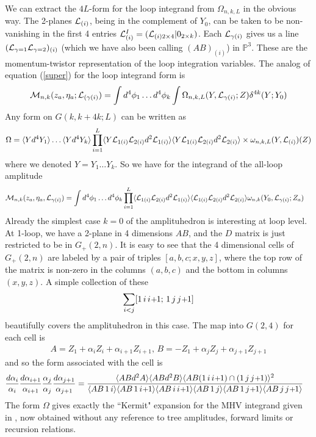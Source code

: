 \documentclass[12pt,nohyper,twosided]{JHEP3}
\newcommand{\be}{\begin{eqnarray}}
\newcommand{\ee}{\end{eqnarray}}
\newcommand{\smallplus}{\hspace{0.5pt}\text{{\small+}}\hspace{-0.5pt}}
\newcommand{\pl}{\smallplus}
\begin{document}
We can extract the $4L$-form for the loop integrand from
$\Omega_{n,k,L}$ in the obvious way. The 2-planes ${\cal L}_{(i)}$,
being in the complement of $Y_0$, can be taken to be non-vanishing
in the first 4 entries ${\cal L}^I_{ (i)}  = ({\cal L}_{(i) 2 \times
4} | 0_{2 \times k})$. Each ${\cal L}_{\gamma (i)}$ gives us a line
$({\cal L}_{\gamma =1} {\cal L}_{\gamma = 2})_{(i)}$ (which we have
also been calling $(AB)_{(i)}$) in $\mathbb{P}^3$. These are the
momentum-twistor representation of the loop integration variables.
The analog of equation (\ref{super}) for the loop integrand form is
\be {\cal M}_{n,k}(z_a,\eta_a; {\cal L}_{(\gamma (i)}) = \int d^{4}
\phi_1 \dots d^4 \phi_k \int \Omega_{n,k,L}(Y,{\cal L}_{\gamma
(i)};Z) \delta^{4k}(Y;Y_0) \ee Any form on $G(k,k+4k;L)$ can be
written as
\begin{equation}
\Omega =  \langle Yd^4 Y_1 \rangle \dots \langle Yd^4 Y_k \rangle
\prod_{i=1}^L \langle Y {\cal L}_{1(i)} {\cal L}_{2(i)} d^2 {\cal
L}_{1(i)} \rangle \langle Y {\cal L}_{1(i)} {\cal L}_{2(i)} d^2
{\cal L}_{2(i)} \rangle \times \omega_{n,k,L}(Y,{\cal L}_{(i)})(Z)
\end{equation}
where we denoted $Y=Y_1\dots Y_k$. So we have for the integrand of
the all-loop amplitude
\begin{align}
{\cal M}_{n,k}(z_a,\eta_a,{\cal L}_{\gamma(i)}) &= \int d^4 \phi_1
\dots d^4 \phi_k  \prod_{i=1}^L \langle {\cal L}_{1(i)} {\cal
L}_{2(i)} d^2 {\cal L}_{1(i)} \rangle \langle  {\cal L}_{1(i)} {\cal
L}_{2(i)} d^2 {\cal L}_{2(i)} \rangle \omega_{n,k}(Y_0,{\cal
L}_{\gamma(i)};Z_a)
\end{align}
Already the simplest case $k=0$ of the amplituhedron is interesting
at loop level. At 1-loop, we have a 2-plane in 4 dimensions $AB$,
and  the $D$ matrix is just restricted to be in $G_+(2,n)$. It is
easy to see that the 4 dimensional cells of $G_+(2,n)$ are labeled
by a pair of triples $[a,b,c;x,y,z]$, where the top row of the
matrix is non-zero in the columns $(a,b,c)$ and the bottom in
columns $(x,y,z)$. A simple collection of these \be \sum _{i<j}
[1\,i\,i\pl1;\,1\,j\,j\pl1] \ee beautifully covers the amplituhedron
in this case. The map into $G(2,4)$ for each cell is \be A = Z_1 +
\alpha_i Z_i + \alpha_{i+1} Z_{i+1}, \, B  = -Z_1 + \alpha_j Z_j +
\alpha_{j+1} Z_{j+1} \ee and so the form associated with the cell is
\begin{align} &\frac{d
\alpha_i}{\alpha_i} \frac{d\alpha_{i+1}}{\alpha_{i+1}}
\frac{\alpha_j}{\alpha_j} \frac{d \alpha_{j+1}}{\alpha_{j+1}} =
\frac{\langle AB d^2 A \rangle \langle AB d^2 B \rangle \langle AB
(1\,i\,i\pl1) \cap (1\,j\,j\pl1) \rangle^2}{\langle AB\,1\,i \rangle
\langle AB\,1\,i\pl1 \rangle \langle AB\,i\,i\pl1 \rangle \langle
AB\,1\,j\rangle \langle AB\,1\,j\pl1 \rangle \langle AB\,j\,j\pl1
\rangle}
\end{align}
The form $\Omega$ gives exactly the ``Kermit" expansion for the MHV
integrand given in \cite{N5}, now obtained without any reference to tree
amplitudes, forward limits or recursion relations.
\end{document}
